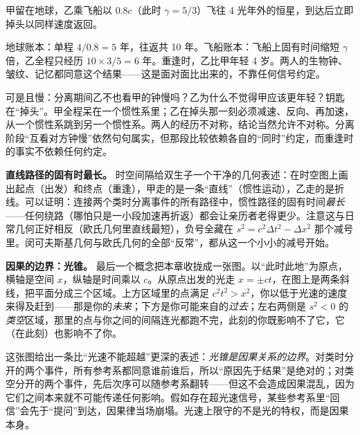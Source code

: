 
\begin{thought}
甲留在地球，乙乘飞船以 \(0.8c\)（此时 \(\gamma=5/3\)）飞往 4 光年外的恒星，到达后立即掉头以同样速度返回。

地球账本：单程 \(4/0.8=5\) 年，往返共 10 年。飞船账本：飞船上固有时间缩短 \(\gamma\) 倍，乙全程只经历 \(10\times 3/5=6\) 年。重逢时，乙比甲年轻 4 岁。两人的生物钟、皱纹、记忆都同意这个结果——这是面对面比出来的，不靠任何信号约定。

可是且慢：分离期间乙不也看甲的钟慢吗？乙为什么不觉得甲应该更年轻？钥匙在“掉头”。甲全程呆在一个惯性系里；乙在掉头那一刻必须减速、反向、再加速，从一个惯性系跳到另一个惯性系。两人的经历不对称，结论当然允许不对称。分离阶段“互看对方钟慢”依然句句属实，但那段比较依赖各自的“同时”约定，而重逢时的事实不依赖任何约定。
\end{thought}

\begin{challenge}
\textbf{直线路径的固有时最长。} 时空间隔给双生子一个干净的几何表述：在时空图上画出起点（出发）和终点（重逢），甲走的是一条“直线”（惯性运动），乙走的是折线。可以证明：连接两个类时分离事件的所有路径中，惯性路径的固有时间\emph{最长}——任何绕路（哪怕只是一小段加速再折返）都会让亲历者老得更少。注意这与日常几何正好相反（欧氏几何里直线最短），负号全藏在 \(s^{2}=c^{2}\Delta t^{2}-\Delta x^{2}\) 那个减号里。闵可夫斯基几何与欧氏几何的全部“反常”，都从这一个小小的减号开始。
\end{challenge}

\begin{mainline}
\textbf{因果的边界：光锥。} 最后一个概念把本章收拢成一张图。以“此时此地”为原点，横轴是空间 \(x\)，纵轴是时间乘以 \(c\)。从原点出发的光走 \(x=\pm ct\)，在图上是两条斜线，把平面分成三个区域。上方区域里的点满足 \(c^{2}t^{2}>x^{2}\)，你以低于光速的速度来得及赶到——那是你的\emph{未来}；下方是你可能来自的\emph{过去}；左右两侧是 \(s^{2}<0\) 的\emph{类空}区域，那里的点与你之间的间隔连光都跑不完，此刻的你既影响不了它，它（在此刻）也影响不了你。

\begin{center}
\end{center}

这张图给出一条比“光速不能超越”更深的表述：\emph{光锥是因果关系的边界}。对类时分开的两个事件，所有参考系都同意谁前谁后，所以“原因先于结果”是绝对的；对类空分开的两个事件，先后次序可以随参考系翻转——但这不会造成因果混乱，因为它们之间本来就不可能传递任何影响。假如存在超光速信号，某些参考系里“回信”会先于“提问”到达，因果律当场崩塌。光速上限守的不是光的特权，而是因果本身。
\end{mainline}

